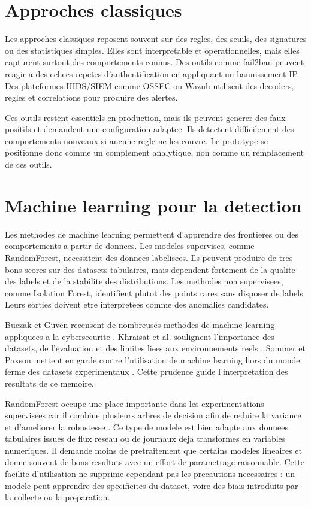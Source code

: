 \section{Approches classiques}
Les approches classiques reposent souvent sur des regles, des seuils, des signatures ou des statistiques simples. Elles sont interpretable et operationnelles, mais elles capturent surtout des comportements connus. Des outils comme fail2ban peuvent reagir a des echecs repetes d'authentification en appliquant un bannissement IP. Des plateformes HIDS/SIEM comme OSSEC ou Wazuh utilisent des decoders, regles et correlations pour produire des alertes.

Ces outils restent essentiels en production, mais ils peuvent generer des faux positifs et demandent une configuration adaptee. Ils detectent difficilement des comportements nouveaux si aucune regle ne les couvre. Le prototype \logminer{} se positionne donc comme un complement analytique, non comme un remplacement de ces outils.

\section{Machine learning pour la detection}
Les methodes de machine learning permettent d'apprendre des frontieres ou des comportements a partir de donnees. Les modeles supervises, comme RandomForest, necessitent des donnees labelisees. Ils peuvent produire de tres bons scores sur des datasets tabulaires, mais dependent fortement de la qualite des labels et de la stabilite des distributions. Les methodes non supervisees, comme Isolation Forest, identifient plutot des points rares sans disposer de labels. Leurs sorties doivent etre interpretees comme des anomalies candidates.

Buczak et Guven recensent de nombreuses methodes de machine learning appliquees a la cybersecurite \cite{buczak2016survey}. Khraisat et al. soulignent l'importance des datasets, de l'evaluation et des limites liees aux environnements reels \cite{khraisat2019survey}. Sommer et Paxson mettent en garde contre l'utilisation de machine learning hors du monde ferme des datasets experimentaux \cite{sommer2010outside}. Cette prudence guide l'interpretation des resultats de ce memoire.

RandomForest occupe une place importante dans les experimentations supervisees car il combine plusieurs arbres de decision afin de reduire la variance et d'ameliorer la robustesse \cite{breiman2001random}. Ce type de modele est bien adapte aux donnees tabulaires issues de flux reseau ou de journaux deja transformes en variables numeriques. Il demande moins de pretraitement que certains modeles lineaires et donne souvent de bons resultats avec un effort de parametrage raisonnable. Cette facilite d'utilisation ne supprime cependant pas les precautions necessaires : un modele peut apprendre des specificites du dataset, voire des biais introduits par la collecte ou la preparation.

